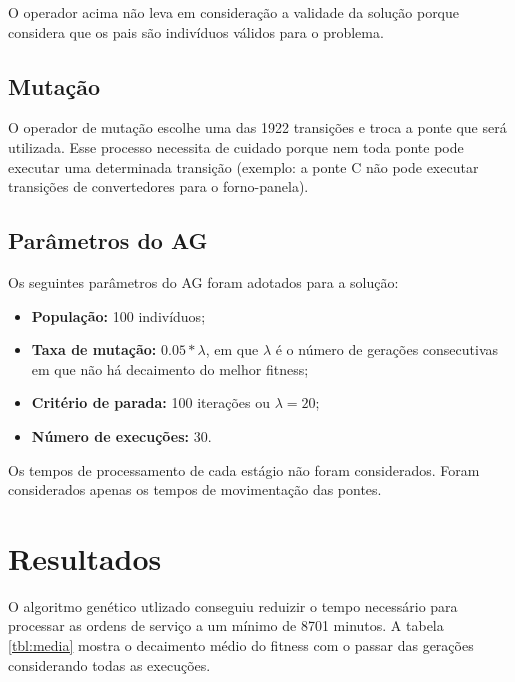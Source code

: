 \documentclass[11pt]{article}
\begin{document}
O operador acima não leva em consideração a validade da solução porque considera que os pais são indivíduos válidos para o problema.

\subsection{Mutação}

O operador de mutação escolhe uma das 1922 transições e troca a ponte que será
utilizada. Esse processo necessita de cuidado porque nem toda ponte pode
executar uma determinada transição (exemplo: a ponte C não pode executar
transições de convertedores para o forno-panela).

\subsection{Parâmetros do AG}

Os seguintes parâmetros do AG foram adotados para a solução:

\begin{itemize}
    \item \textbf{População:} 100 indivíduos;
    \item \textbf{Taxa de mutação:} $0.05*\lambda$, em que $\lambda$ é o número de gerações consecutivas em que não há decaimento do melhor fitness;
    \item \textbf{Critério de parada:} 100 iterações ou $\lambda=20$;
    \item \textbf{Número de execuções:} 30.
\end{itemize}

Os tempos de processamento de cada estágio não foram considerados. Foram
considerados apenas os tempos de movimentação das pontes.

\section{Resultados}

O algoritmo genético utlizado conseguiu reduizir o tempo necessário para
processar as ordens de serviço a um mínimo de 8701 minutos. A tabela
\ref{tbl:media} mostra o decaimento médio do fitness com o passar das gerações
considerando todas as execuções.
\end{document}
